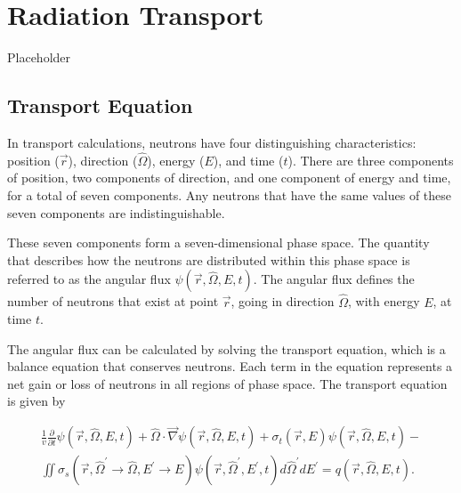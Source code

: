 \section{Radiation Transport}
\label{sec:bg:rt}

Placeholder

\subsection{Transport Equation}
\label{sec:bg:rt:te}

In transport calculations, neutrons have four distinguishing characteristics: position ($\vec{r}$), direction ($\hat{\Omega}$), energy ($E$), and time ($t$).
There are three components of position, two components of direction, and one component of energy and time, for a total of seven components.
Any neutrons that have the same values of these seven components are indistinguishable.

These seven components form a seven-dimensional phase space.
The quantity that describes how the neutrons are distributed within this phase space is referred to as the angular flux $\psi\left(\vec{r},\hat{\Omega},E,t\right)$.
The angular flux defines the number of neutrons that exist at point $\vec{r}$, going in direction ${\hat{\Omega}}$, with energy $E$, at time $t$.

The angular flux can be calculated by solving the transport equation, which is a balance equation that conserves neutrons.
Each term in the equation represents a net gain or loss of neutrons in all regions of phase space.
The transport equation is given by

\begin{multline}\label{eq:bg:rt:transport-timedep}
  \frac{1}{v}\frac{\partial}{\partial t}\psi\left(\vec{r},\hat{\Omega},E,t\right) +
  \hat{\Omega}\cdot\vec{\nabla}\psi\left(\vec{r},\hat{\Omega},E,t\right) +
  \sigma_t\left(\vec{r},E\right)\psi\left(\vec{r},\hat{\Omega},E,t\right) - \\
  \iint\sigma_s\left(\vec{r},\hat{\Omega}^\prime\rightarrow\hat{\Omega},E^\prime\rightarrow E\right)\psi\left(\vec{r},\hat{\Omega}^\prime,E^\prime,t\right)d\hat{\Omega}^\prime dE^\prime =
  q\left(\vec{r},\hat{\Omega},E,t\right).
\end{multline}

